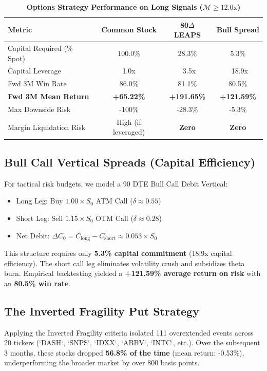 \documentclass[11pt]{article}
\begin{document}
\begin{table}[htbp]
\centering
\small
\caption{\textbf{Options Strategy Performance on Long Signals ($\mathcal{M} \ge 12.0\text{x}$)}}
\label{tab:options_results}
\begin{tabularx}{\columnwidth}{@{}X c c c@{}}
\toprule
\textbf{Metric} & \textbf{Common Stock} & \textbf{80$\Delta$ LEAPS} & \textbf{Bull Spread} \\
\midrule
Capital Required (\% Spot) & 100.0\% & 28.3\% & 5.3\% \\
Capital Leverage & 1.0x & ~3.5x & ~18.9x \\
Fwd 3M Win Rate & 86.0\% & 81.1\% & 80.5\% \\
\textbf{Fwd 3M Mean Return} & \textbf{+65.22\%} & \textbf{+191.65\%} & \textbf{+121.59\%} \\
Max Downside Risk & -100\% & -28.3\% & -5.3\% \\
Margin Liquidation Risk & High (if leveraged) & \textbf{Zero} & \textbf{Zero} \\
\bottomrule
\end{tabularx}
\end{table}

\subsection{Bull Call Vertical Spreads (Capital Efficiency)}

For tactical risk budgets, we model a 90 DTE Bull Call Debit Vertical:
\begin{itemize}
    \item Long Leg: Buy $1.00 \times S_0$ ATM Call ($\delta \approx 0.55$)
    \item Short Leg: Sell $1.15 \times S_0$ OTM Call ($\delta \approx 0.28$)
    \item Net Debit: $\Delta C_0 = C_{\text{long}} - C_{\text{short}} \approx 0.053 \times S_0$
\end{itemize}
This structure requires only \textbf{5.3\% capital commitment} (18.9x capital efficiency). The short call leg eliminates volatility crush and subsidizes theta burn. Empirical backtesting yielded a \textbf{+121.59\% average return on risk} with an \textbf{80.5\% win rate}.

\subsection{The Inverted Fragility Put Strategy}

Applying the Inverted Fragility criteria isolated 111 overextended events across 20 tickers (`DASH`, `SNPS`, `IDXX`, `ABBV`, `INTC`, etc.). Over the subsequent 3 months, these stocks dropped \textbf{56.8\% of the time} (mean return: -0.53\%), underperforming the broader market by over 800 basis points.
\end{document}
